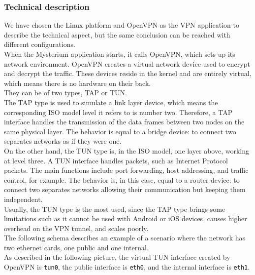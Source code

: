 \documentclass[12pt]{article}
\begin{document}
	\subsubsection{Technical description}
	We have chosen the Linux platform and OpenVPN as the VPN application to describe the technical aspect, but the same conclusion can be reached with different configurations.\\
	When the Mysterium application starts, it calls OpenVPN, which sets up its network environment. OpenVPN creates a virtual network device used to encrypt and decrypt the traffic. These devices reside in the kernel and are entirely virtual, which means there is no hardware on their back.\\
	They can be of two types, TAP or TUN.\\
	The TAP type is used to simulate a link layer device, which means the corresponding ISO model level it refers to is number two. Therefore, a TAP interface handles the transmission of the data frames between two nodes on the same physical layer. The behavior is equal to a bridge device: to connect two separates networks as if they were one.\\
	On the other hand, the TUN type is, in the ISO model, one layer above, working at level three. A TUN interface handles packets, such as Internet Protocol packets. The main functions include port forwarding, host addressing, and traffic control, for example. The behavior is, in this case, equal to a router device: to connect two separates networks allowing their communication but keeping them independent.\\
	Usually, the TUN type is the most used, since the TAP type brings some limitations such as it cannot be used with Android or iOS devices, causes higher overhead on the VPN tunnel, and scales poorly.\\
	The following schema describes an example of a scenario where the network has two ethernet cards, one public and one internal.\\
	As described in the following picture, the virtual TUN interface created by OpenVPN is \lstinline{tun0}, the public interface is \lstinline{eth0}, and the internal interface is \lstinline{eth1}.\\
\end{document}
